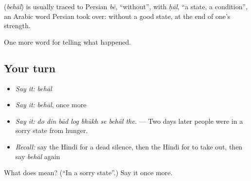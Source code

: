 \begin{cousinweb}
\textbf{} (\emph{behāl}) is usually traced to Persian \emph{bē}, \textquotedblleft{}without\textquotedblright{}, with \emph{ḥāl}, \textquotedblleft{}a state, a condition\textquotedblright{}, an Arabic word Persian took over: without a good state, at the end of one's strength.
\end{cousinweb}

\begin{grammarlens}[title={What you've built}]
One more word for telling what happened.
\end{grammarlens}

\subsection*{Your turn}
\begin{itemize}
\raggedright
  \item \emph{Say it:} \emph{behāl}
  \item \emph{Say it:} \emph{behāl}, once more
  \item \emph{Say it:} \emph{do din bād log bhūkh se behāl the.} — Two days later people were in a sorry state from hunger.
  \item \emph{Recall:} say the Hindi for a dead silence, then the Hindi for to take out, then say \emph{behāl} again
\end{itemize}

\begin{tcolorbox}[breakable,colback=teal!4,colframe=teal!35!black,title={Before you move on}]
What does  mean? (\textquotedblleft{}In a sorry state\textquotedblright{}.) Say it once more.
\end{tcolorbox}
